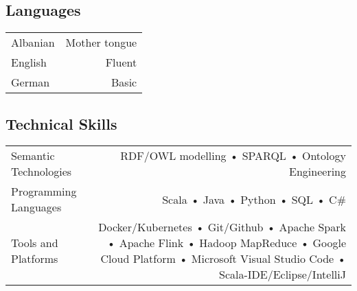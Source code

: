 \subsection*{Languages}
\begin{tabular}{L!{\VRule}R}
Albanian & Mother tongue \\
English & Fluent \\
German & Basic 
\end{tabular}

\subsection*{Technical Skills}
\begin{tabular}{L!{\VRule}R}
	Semantic Technologies & RDF/OWL modelling • SPARQL • Ontology Engineering\\
    Programming Languages & Scala • Java • Python • SQL • C\#\\
     Tools and Platforms & Docker/Kubernetes • Git/Github • Apache Spark • Apache Flink • Hadoop MapReduce • Google Cloud Platform • Microsoft Visual Studio Code • Scala-IDE/Eclipse/IntelliJ
\end{tabular}